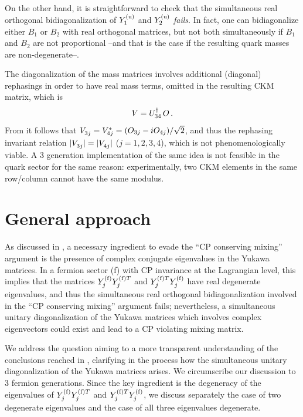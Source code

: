 \documentclass[12pt,a4paper]{article}
\begin{document}
On the other hand, it is straightforward to check that the simultaneous real orthogonal bidiagonalization of $Y_{1}^{\rm (u)}$ and $Y_{2}^{\rm (u)}$ \emph{fails}. In fact, one can bidiagonalize either $B_1$ or $B_2$ with real orthogonal matrices, but not both simultaneously if $B_1$ and $B_2$ are not proportional --and that is the case if the resulting quark masses are non-degenerate--.

The diagonalization of the mass matrices involves additional (diagonal) rephasings in order to have real mass terms, omitted in the resulting CKM matrix, which is
\begin{equation}\label{eq:exCKM:00}
V =U_{34}^\dagger\,O\,.
\end{equation}
From  it follows that $\V{3j}=\Vc{4j}=(O_{3j}-iO_{4j})/\sqrt{2}$, and thus the rephasing invariant relation $|\V{3j}|=|\V{4j}|$ ($j=1,2,3,4$), which is not phenomenologically viable. A 3 generation implementation of the same idea is not feasible in the quark sector for the same reason: experimentally, two CKM elements in the same row/column cannot have the same modulus.

\section{General approach\label{SEC:Gen}}
As discussed in \cite{Gronau:1987xz}, a necessary ingredient to evade the ``CP conserving mixing'' argument is the presence of complex conjugate eigenvalues in the Yukawa matrices. In a fermion sector (f) with CP invariance at the Lagrangian level, this implies that the matrices $Y_{j}^{\rm (f)}Y_{j}^{{\rm (f)}T}$ and $Y_{j}^{{\rm (f)}T}Y_{j}^{\rm (f)}$ have real degenerate eigenvalues, and thus the simultaneous real orthogonal bidiagonalization involved in the ``CP conserving mixing'' argument fails; nevertheless, a simultaneous unitary diagonalization of the Yukawa matrices which involves complex eigenvectors could exist and lead to a CP violating mixing matrix.

We address the question aiming to a more transparent understanding of the conclusions reached in \cite{Gronau:1987xz}, clarifying in the process how the simultaneous unitary diagonalization of the Yukawa matrices arises. We circumscribe our discussion to 3 fermion generations. Since the key ingredient is the degeneracy of the eigenvalues of $Y_{j}^{\rm (f)}Y_{j}^{{\rm (f)}T}$ and $Y_{j}^{{\rm (f)}T}Y_{j}^{\rm (f)}$, we discuss separately the case of two degenerate eigenvalues and the case of all three eigenvalues degenerate.
\end{document}
